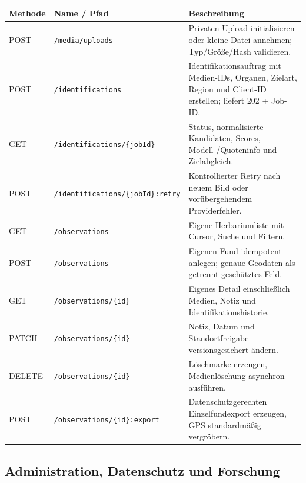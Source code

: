 \documentclass[10pt,a4paper,oneside]{article}
\newcommand{\Code}[1]{\texttt{\small #1}}
\begin{document}
\begin{longtable}{@{}p{14mm}p{54mm}p{92mm}@{}}
\toprule
\textbf{Methode} & \textbf{Name / Pfad} & \textbf{Beschreibung} \\
\midrule
\endhead
POST & \Code{/media/uploads} & Privaten Upload initialisieren oder kleine Datei annehmen; Typ/Größe/Hash validieren. \\
POST & \Code{/identifications} & Identifikationsauftrag mit Medien-IDs, Organen, Zielart, Region und Client-ID erstellen; liefert 202 + Job-ID. \\
GET & \Code{/identifications/\{jobId\}} & Status, normalisierte Kandidaten, Scores, Modell-/Quoteninfo und Zielabgleich. \\
POST & \Code{/identifications/\{jobId\}:retry} & Kontrollierter Retry nach neuem Bild oder vorübergehendem Providerfehler. \\
GET & \Code{/observations} & Eigene Herbariumliste mit Cursor, Suche und Filtern. \\
POST & \Code{/observations} & Eigenen Fund idempotent anlegen; genaue Geodaten als getrennt geschütztes Feld. \\
GET & \Code{/observations/\{id\}} & Eigenes Detail einschließlich Medien, Notiz und Identifikationshistorie. \\
PATCH & \Code{/observations/\{id\}} & Notiz, Datum und Standortfreigabe versionsgesichert ändern. \\
DELETE & \Code{/observations/\{id\}} & Löschmarke erzeugen, Medienlöschung asynchron ausführen. \\
POST & \Code{/observations/\{id\}:export} & Datenschutzgerechten Einzelfundexport erzeugen, GPS standardmäßig vergröbern. \\
\bottomrule
\end{longtable}

\subsection{Administration, Datenschutz und Forschung}
\end{document}
